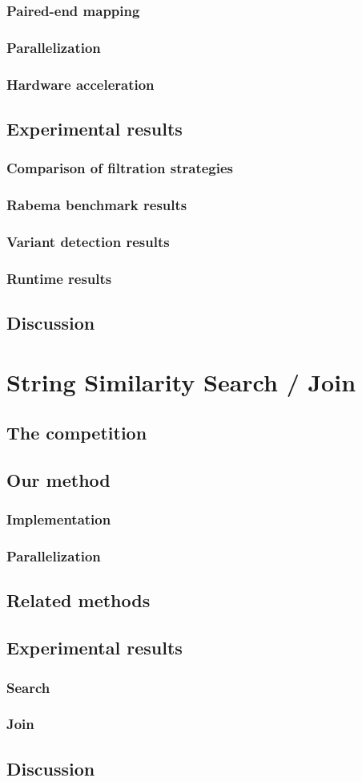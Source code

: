 \subsection{Paired-end mapping}
\subsection{Parallelization}
\subsection{Hardware acceleration}
\section{Experimental results}
\subsection{Comparison of filtration strategies}
\subsection{Rabema benchmark results}
\subsection{Variant detection results}
\subsection{Runtime results}
\section{Discussion}

\chapter{String Similarity Search / Join}
\section{The competition}
\section{Our method}
\subsection{Implementation}
\subsection{Parallelization}
\section{Related methods}
\section{Experimental results}
\subsection{Search}
\subsection{Join}
\section{Discussion}
